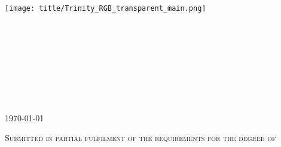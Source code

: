 \begin{titlepage}

\center %



\texttt{[image: title/Trinity\_RGB\_transparent\_main.png]}\\[1cm] 
\ifdefined\school
\Large \textsc{\school} \\[1.5cm] %
\ifdefined\department
\large \department\\[1.5cm] %
\fi

\makeatletter
\textsc{{ \huge \bfseries \thesistitle}}\\[1.5cm] %
 


\ifdefined\authorid
\authorname\\ %
\authorid\\[2cm] %
\else
\textsc{\authorname}\\[2cm] %
\fi

\textsc{{\large \supervisor}}\\
\textsc{{\large \today}}\\[2cm] %



\vfill

\textsc{\normalsize Submitted in partial fulfilment of the requirements for the degree of \\
\degree}

\vfill %

\end{titlepage}